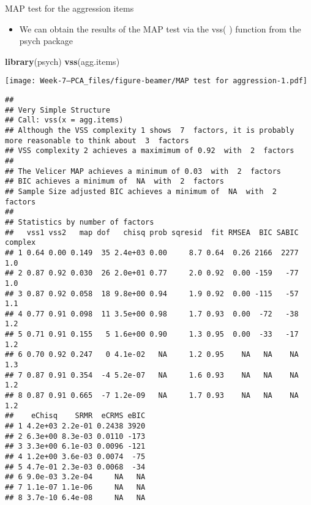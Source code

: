 \documentclass[
  ignorenonframetext,
]{beamer}
\newenvironment{Shaded}{\begin{snugshade}}{\end{snugshade}}
\newcommand{\KeywordTok}[1]{\textcolor[rgb]{0.13,0.29,0.53}{\textbf{#1}}}
\newcommand{\NormalTok}[1]{#1}
\providecommand{\tightlist}{%
  \setlength{\itemsep}{0pt}\setlength{\parskip}{0pt}}
\begin{document}
\begin{frame}[fragile]{MAP test for the aggression items}
\protect\hypertarget{map-test-for-the-aggression-items}{}

\begin{itemize}
\tightlist
\item
  We can obtain the results of the MAP test via the vss( ) function from
  the psych package
\end{itemize}

\begin{Shaded}
\begin{Highlighting}[]
\KeywordTok{library}\NormalTok{(psych)}
\KeywordTok{vss}\NormalTok{(agg.items)}
\end{Highlighting}
\end{Shaded}

\texttt{[image: Week-7---PCA\_files/figure-beamer/MAP test for aggression-1.pdf]}

\begin{verbatim}
## 
## Very Simple Structure
## Call: vss(x = agg.items)
## Although the VSS complexity 1 shows  7  factors, it is probably more reasonable to think about  3  factors
## VSS complexity 2 achieves a maximimum of 0.92  with  2  factors
## 
## The Velicer MAP achieves a minimum of 0.03  with  2  factors 
## BIC achieves a minimum of  NA  with  2  factors
## Sample Size adjusted BIC achieves a minimum of  NA  with  2  factors
## 
## Statistics by number of factors 
##   vss1 vss2   map dof   chisq prob sqresid  fit RMSEA  BIC SABIC complex
## 1 0.64 0.00 0.149  35 2.4e+03 0.00     8.7 0.64  0.26 2166  2277     1.0
## 2 0.87 0.92 0.030  26 2.0e+01 0.77     2.0 0.92  0.00 -159   -77     1.0
## 3 0.87 0.92 0.058  18 9.8e+00 0.94     1.9 0.92  0.00 -115   -57     1.1
## 4 0.77 0.91 0.098  11 3.5e+00 0.98     1.7 0.93  0.00  -72   -38     1.2
## 5 0.71 0.91 0.155   5 1.6e+00 0.90     1.3 0.95  0.00  -33   -17     1.2
## 6 0.70 0.92 0.247   0 4.1e-02   NA     1.2 0.95    NA   NA    NA     1.3
## 7 0.87 0.91 0.354  -4 5.2e-07   NA     1.6 0.93    NA   NA    NA     1.2
## 8 0.87 0.91 0.665  -7 1.2e-09   NA     1.7 0.93    NA   NA    NA     1.2
##    eChisq    SRMR  eCRMS eBIC
## 1 4.2e+03 2.2e-01 0.2438 3920
## 2 6.3e+00 8.3e-03 0.0110 -173
## 3 3.3e+00 6.1e-03 0.0096 -121
## 4 1.2e+00 3.6e-03 0.0074  -75
## 5 4.7e-01 2.3e-03 0.0068  -34
## 6 9.0e-03 3.2e-04     NA   NA
## 7 1.1e-07 1.1e-06     NA   NA
## 8 3.7e-10 6.4e-08     NA   NA
\end{verbatim}

\end{frame}
\end{document}
